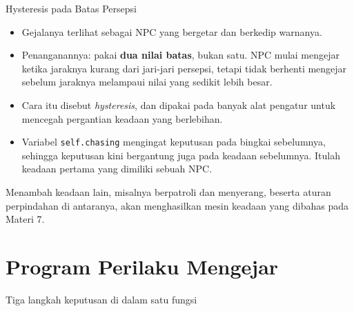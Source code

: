 \documentclass[aspectratio=169,10pt]{beamer}
\begin{document}
\begin{frame}{Hysteresis pada Batas Persepsi}
\begin{itemize}
  \item Gejalanya terlihat sebagai NPC yang bergetar dan berkedip warnanya.
  \item Penanganannya: pakai \textbf{dua nilai batas}, bukan satu. NPC mulai
        mengejar ketika jaraknya kurang dari jari-jari persepsi, tetapi tidak
        berhenti mengejar sebelum jaraknya melampaui nilai yang sedikit lebih
        besar.
  \item Cara itu disebut \emph{hysteresis}, dan dipakai pada banyak alat
        pengatur untuk mencegah pergantian keadaan yang berlebihan.
  \item Variabel \texttt{self.chasing} mengingat keputusan pada bingkai
        sebelumnya, sehingga keputusan kini bergantung juga pada keadaan
        sebelumnya. Itulah keadaan pertama yang dimiliki sebuah NPC.
\end{itemize}
\vspace{0.12cm}
\begin{kotak}
Menambah keadaan lain, misalnya berpatroli dan menyerang, beserta aturan
perpindahan di antaranya, akan menghasilkan mesin keadaan yang dibahas pada
Materi 7.
\end{kotak}
\end{frame}

\section{Program Perilaku Mengejar}
  {Tiga langkah keputusan di dalam satu fungsi}
\end{document}
